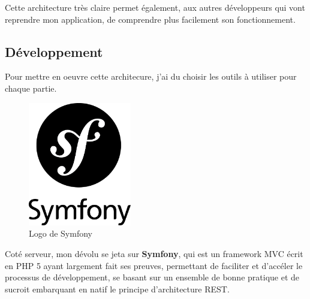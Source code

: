 \documentclass{report}
\begin{document}
Cette architecture très claire permet également, aux autres développeurs qui vont reprendre mon application, de comprendre plus facilement son fonctionnement. 





\newpage





\subsection{Développement}
Pour mettre en oeuvre cette architecure, j'ai du choisir les outils à utiliser pour chaque partie. 

\begin{minipage}{0.5\textwidth}
	\begin{figure}[H]
		\centering
		\includegraphics[width=0.4\textwidth]{assets/symfo.png}
		\caption{Logo de Symfony}
	\end{figure}
\end{minipage} 
\hfill
\begin{minipage}{0.45\textwidth}
	Coté serveur, mon dévolu se jeta sur \textbf{Symfony}, qui est un \gls{framework} \gls{MVC} écrit en PHP 5 ayant largement fait ses preuves, permettant de faciliter et d'accéler le processus de développement, se basant sur un ensemble de bonne pratique et de sucroit embarquant en natif le principe d'architecture \gls{REST}.
\end{minipage}
\end{document}
